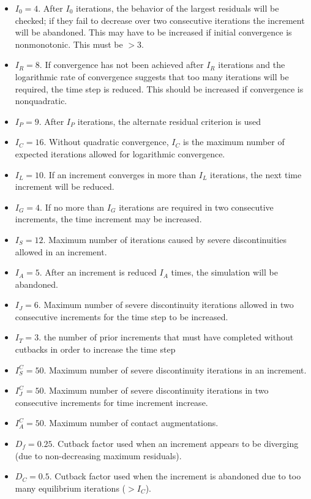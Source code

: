 \documentclass[10pt,letterpaper,oneside]{report}
\begin{document}
\begin{itemize}
\item $I_0 = 4$.  After $I_0$ iterations, the behavior of the largest residuals will be checked; if they fail to decrease over two consecutive iterations the increment will be abandoned.  This may have to be increased if initial convergence is nonmonotonic.  This must be $> 3$.
\item $I_R = 8$.  If convergence has not been achieved after $I_R$ iterations and the logarithmic rate of convergence suggests that too many iterations will be required, the time step is reduced.  This should be increased if convergence is nonquadratic.  
\item $I_P = 9$.  After $I_P$ iterations, the alternate residual criterion is used
\item $I_C = 16$.  Without quadratic convergence, $I_C$ is the maximum number of expected iterations allowed for logarithmic convergence.
\item $I_L = 10$.  If an increment converges in more than $I_L$ iterations, the next time increment will be reduced. 
\item $I_G = 4$.  If no more than $I_G$ iterations are required in two consecutive increments, the time increment may be increased.
\item $I_S = 12$.  Maximum number of iterations caused by severe discontinuities allowed in an increment.
\item $I_A = 5$.  After an increment is reduced $I_A$ times, the simulation will be abandoned.  
\item $I_J =6 $.  Maximum number of severe discontinuity iterations allowed in two consecutive increments for the time step to be increased.
\item $I_T = 3$. the number of prior increments that must have completed without cutbacks in order to increase the time step
\item $I_S^C = 50$.  Maximum number of severe discontinuity iterations in an increment.
\item $I_J^C = 50$.  Maximum number of severe discontinuity iterations in two consecutive increments for time increment increase.
\item $I_A^C = 50$.  Maximum number of contact augmentations.
\item $D_f = 0.25$.  Cutback factor used when an increment appears to be diverging (due to non-decreasing maximum residuals).
\item $D_C = 0.5$.   Cutback factor used when the increment is abandoned due to too many equilibrium iterations ($ > I_C$).

\end{itemize}
\end{document}
